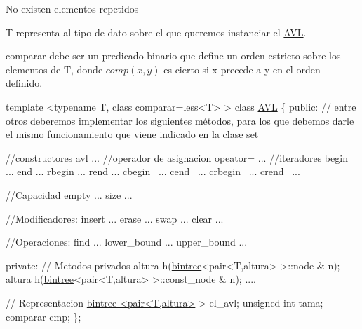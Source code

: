 \begin{DoxyItemize}
\item No existen elementos repetidos \item T representa al tipo de dato sobre el que queremos instanciar el \hyperlink{classAVL}{A\-V\-L}. \item comparar debe ser un predicado binario que define un orden estricto sobre los elementos de T, donde $ comp(x,y) $ es cierto si x precede a y en el orden definido.\end{DoxyItemize}

\begin{DoxyCode}
\textcolor{keyword}{template} <\textcolor{keyword}{typename} T, \textcolor{keyword}{class} comparar=less<T> >
\textcolor{keyword}{class }\hyperlink{classAVL}{AVL} \{
\textcolor{keyword}{public}:
\textcolor{comment}{// entre otros deberemos implementar los siguientes métodos, para los que debemos darle el mismo
       funcionamiento que viene indicado en la clase set}

\textcolor{comment}{//constructores}
avl ...
\textcolor{comment}{//operador de asignacion}
opeator=  ...
\textcolor{comment}{//iteradores}
begin  ...
end ...
rbegin ...
rend ...
cbegin  ...
cend  ...
crbegin  ...
crend  ...

\textcolor{comment}{//Capacidad}
empty ...
size ...

\textcolor{comment}{//Modificadores:}
insert  ...
erase ...
swap  ...
clear  ...

\textcolor{comment}{//Operaciones:}
find  ...
lower\_bound  ...
upper\_bound  ...

private:
  \textcolor{comment}{// Metodos privados}
   altura h(\hyperlink{classbintree}{bintree}<pair<T,altura> >::node & n);
   altura h(\hyperlink{classbintree}{bintree}<pair<T,altura> >::const\_node & n);
   .... 

 \textcolor{comment}{// Representacion}
  \hyperlink{classbintree}{bintree <pair<T,altura>} > el\_avl;
  \textcolor{keywordtype}{unsigned} \textcolor{keywordtype}{int} tama;
  comparar cmp;
\};
\end{DoxyCode}
 